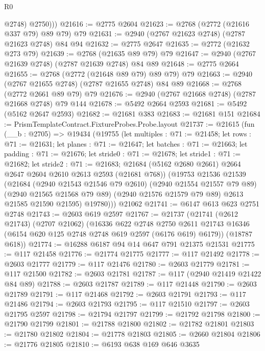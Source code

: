 \begin{lexlean}{R0}
\begin{coremodule}
            @2748)
          @2750)))
@21616 := @2775 @2604
@21623 := @2768 (@2772 (@21616 @337 @79) @89 @79) @79
@21631 := @2940 (@2767 @21623 @2748) (@2787 @21623 @2748) @84 @94
@21632 := @2775 @2647
@21635 := @2772 (@21632 @273 @79)
@21639 := @2768 (@21635 @89 @79) @79
@21647 := @2940 (@2767 @21639 @2748) (@2787 @21639 @2748) @84 @89
@21648 := @2775 @2664
@21655 := @2768 (@2772 (@21648 @89 @79) @89 @79) @79
@21663 := @2940 (@2767 @21655 @2748) (@2787 @21655 @2748) @84 @89
@21668 := @2768 (@2772 @2661 @89 @79) @79
@21676 := @2940 (@2767 @21668 @2748) (@2787 @21668 @2748) @79 @144
@21678 := @5492 @2664 @2593
@21681 := @5492 (@5162 @2647 @2593)
@21682 := @21681 @383
@21683 := @21681 @151
@21684 := PrismTemplateContract.FixtureProbes.Probe.layout
@21737 := @21615
    (fun (__b : @2705) =>
    @19434
      (@19755
        (let multiples : @71 := @21458;
        let rows : @71 := @21631;
        let planes : @71 := @21647;
        let batches : @71 := @21663;
        let padding : @71 := @21676;
        let stride0 : @71 := @21678;
        let stride1 : @71 := @21682;
        let stride2 : @71 := @21683;
        @21684 (@5162 @2680 @2661) @2664 @2647 @2604 @2610 @2613 @2593 (@21681 @768))
        (@19753
          @21536
          @21539
          (@21684
            (@2940 @21543 @21546 @79 @2610)
            (@2940 @21554 @21557 @79 @89)
            (@2940 @21565 @21568 @79 @89)
            (@2940 @21576 @21579 @79 @89)
            @2613
            @21585
            @21590
            @21595)
          @19780)))
    @21062
@21741 := @6147 @613 @623 @2751 @2748
@21743 := @2603 @619 @2597
@21767 := @21737
    (@21741
      (@2612 @21743)
      (@2707 @21062)
      (@16336
        @622
        @2748
        @2750
        @2611
        @21743
        @16346
        (@6154 @620 @125 @2748 @2748 @619 @2597 (@6176 @619) @6179))
      (@18787 @618))
@21774 := @16288 @6187 @94 @14 @647 @791 @21375 @21531
@21775 := @117 @21458
@21776 := @21774 @21775
@21777 := @117 @21492
@21778 := @2603 @21777
@21779 := @117 @21476
@21780 := @2603 @21779
@21781 := @117 @21500
@21782 := @2603 @21781
@21787 := @117 (@2940 @21419 @21422 @84 @89)
@21788 := @2603 @21787
@21789 := @117 @21448
@21790 := @2603 @21789
@21791 := @117 @21468
@21792 := @2603 @21791
@21793 := @117 @21486
@21794 := @2603 @21793
@21795 := @117 @21510
@21797 := @2603 @21795 @2597
@21798 := @21794 @21797
@21799 := @21792 @21798
@21800 := @21790 @21799
@21801 := @21788 @21800
@21802 := @21782 @21801
@21803 := @21780 @21802
@21804 := @21778 @21803
@21805 := @2660 @21804
@21806 := @21776 @21805
@21810 := @6193 @638 @169 @646 @3635

\end{coremodule}
\end{lexlean}
